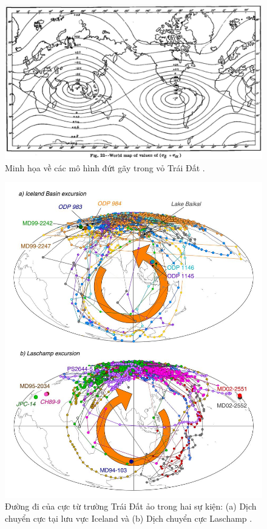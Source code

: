 \documentclass[10pt,twocolumn,letterpaper]{article}
\begin{document}
\begin{figure}[t]
\begin{center}
   \includegraphics[width=1\linewidth]{meinesz3.jpg}
\end{center}
   \caption{Minh họa về các mô hình đứt gãy trong vỏ Trái Đất \cite{36}.}
\label{fig:8}
\label{fig:onecol}
\end{figure}

\begin{figure}[t]
\begin{center}
   \includegraphics[width=0.9\linewidth]{laj.jpg}
\end{center}
   \caption{Đường đi của cực từ trường Trái Đất ảo trong hai sự kiện: (a) Dịch chuyển cực tại lưu vực Iceland và (b) Dịch chuyển cực Laschamp \cite{35}.}
\label{fig:7}
\label{fig:onecol}
\end{figure}
\end{document}
